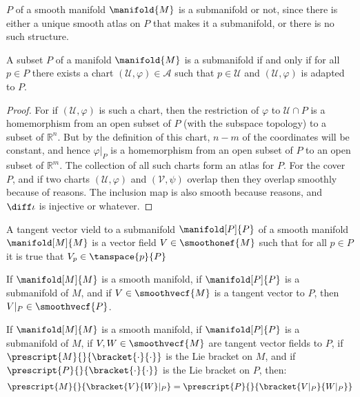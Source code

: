         $P$ of a smooth manifold $\manifold{M}$ is a submanifold or not,
        since there is either a unique smooth atlas on $P$ that makes it a
        submanifold, or there is no such structure.
        \begin{theorem}
            A subset $P$ of a manifold $\manifold{M}$ is a submanifold if
            and only if for all $p\in{P}$ there exists a chart
            $(\mathcal{U},\varphi)\in\mathcal{A}$ such that
            $p\in\mathcal{U}$ and $(\mathcal{U},\varphi)$ is adapted to $P$.
        \end{theorem}
        \begin{proof}
            For if $(\mathcal{U},\varphi)$ is such a chart, then the
            restriction of $\varphi$ to $\mathcal{U}\cap{P}$ is a
            homemorphism from an open subset of $P$ (with the subspace
            topology) to a subset of $\mathbb{R}^{n}$. But by the definition
            of this chart, $n-m$ of the coordinates will be constant, and
            hence $\varphi|_{P}$ is a homemorphism from an open subset of
            $P$ to an open subset of $\mathbb{R}^{m}$. The collection of all
            such charts form an atlas for $P$. For the cover $P$, and if two
            charts $(\mathcal{U},\varphi)$ and $(\mathcal{V},\psi)$ overlap
            then they overlap smoothly because of reasons. The inclusion map
            is also smooth because reasons, and $\diff\iota$ is injective or
            whatever.
        \end{proof}
        \begin{definition}
            A tangent vector vield to a submanifold $\manifold[P]{P}$ of a
            smooth manifold $\manifold[M]{M}$ is a vector field
            $V\in\smoothonef{M}$ such that for all $p\in{P}$ it is true that
            $V_{p}\in\tanspace{p}{P}$
        \end{definition}
        \begin{theorem}
            If $\manifold[M]{M}$ is a smooth manifold, if $\manifold[P]{P}$
            is a submanifold of $M$, and if $V\in\smoothvecf{M}$ is a
            tangent vector to $P$, then $V|_{P}\in\smoothvecf{P}$.
        \end{theorem}
        \begin{theorem}
            If $\manifold[M]{M}$ is a smooth manifold, if $\manifold[P]{P}$
            is a submanifold of $M$, if $V,W\in\smoothvecf{M}$ are tangent
            vector fields to $P$, if
            $\prescript{M}{}{\bracket{\cdot}{\cdot}}$ is the Lie bracket on
            $M$, and if $\prescript{P}{}{\bracket{\cdot}{\cdot}}$ is the Lie
            bracket on $P$, then:
            \begin{equation}
                \prescript{M}{}{\bracket{V}{W}|_{P}}
                =\prescript{P}{}{\bracket{V|_{P}}{W|_{P}}}
            \end{equation}
        \end{theorem}
